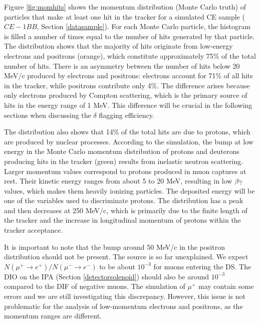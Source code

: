 Figure \ref{fig:momhits} shows the 
momentum distribution (Monte Carlo truth) of 
particles that make at least one hit in the 
tracker for a simulated CE sample ($CE-1BB$, 
Section \ref{datasample}). 
For each Monte Carlo particle, the 
histogram is filled a number of times 
equal to the number of hits generated 
by that particle.
The distribution shows that the 
majority of hits originate from 
low-energy electrons and positrons 
(orange), which constitute approximately 
75\% of the total number of hits. 
There is an asymmetry between the 
number of hits below 20 MeV/c 
produced by electrons and positrons: 
electrons account for 
71\% of all hits in 
the tracker, while positrons 
contribute only 4\%. The difference  
arises because only electrons produced by Compton scattering, which is 
the primary source of hits in the energy 
range of 1 MeV. This difference 
will be crucial in 
the following sections when discussing 
the $\delta$ flagging efficiency.

The distribution also shows that 14\% of 
the total hits are due to protons, 
which are produced by nuclear processes. 
According to the simulation, the bump at low energy in the Monte Carlo momentum 
distribution of protons and deuterons producing 
hits in the tracker (green) results from inelastic neutron scattering.
Larger momentum values correspond to protons produced in muon 
captures at rest. Their kinetic energy ranges from about 
5 to 20 MeV, resulting in low $\beta \gamma$ values, 
which makes them heavily ionizing particles. 
The deposited energy will be one of the variables used to discriminate protons. 
The distribution has a peak and then decreases at 250 MeV/c, which is 
primarily due to the finite length of the tracker and the increase in 
longitudinal momentum of protons within the tracker acceptance.

It is important to note that the bump 
around 50 MeV/c in the positron distribution should not be 
present. The source is so far unexplained. 
We expect $N(\mu^+ \rightarrow e^+ )/N(\mu^- \rightarrow e^- )$ 
to be about $10^{-3}$ for muons entering the DS. The DIO on the IPA 
(Section \ref{detectorsolenoid}) should also be around $10^{-3}$ compared to the DIF of 
negative muons. The simulation of $\mu^+$ may 
contain some errors and we are still 
investigating this discrepancy. However, this issue is not problematic for the analysis 
of low-momentum electrons and positrons, 
as the momentum ranges are different.

